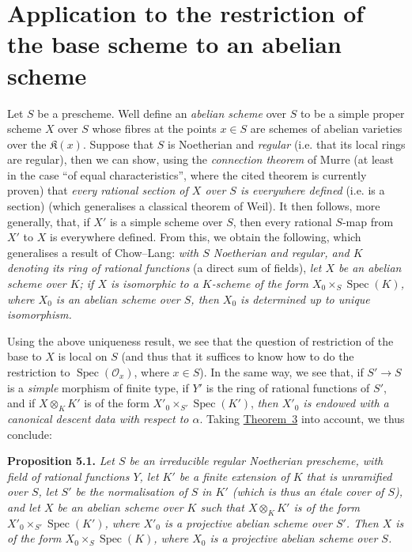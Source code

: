 \documentclass{article}
\newenvironment{itenv}[1]
  {\phantomsection\par\medskip\noindent\textbf{#1.}\itshape}
  {\medskip}
\newcommand{\scr}[1]{{\mathscr{#1}}}
\newcommand{\kres}{\mathfrak{K}}
\DeclareMathOperator{\Spec}{Spec}
\newcommand{\oldpage}[1]{\marginpar{\footnotesize$\Big\vert$ \textit{p.~#1}}}
\begin{document}
\section{Application to the restriction of the base scheme to an abelian scheme}
\label{B.5}

Let $S$ be a prescheme.
Well define an \emph{abelian scheme} over $S$ to be a simple proper scheme $X$
\oldpage{190-26}
over $S$ whose fibres at the points $x\in S$ are schemes of abelian varieties over the $\kres(x)$.
Suppose that $S$ is Noetherian and \emph{regular} (i.e. that its local rings are regular), then we can show, using the \emph{connection theorem} of Murre \cite{4} (at least in the case ``of equal characteristics'', where the cited theorem is currently proven) that \emph{every rational section of $X$ over $S$ is everywhere defined} (i.e. is a section) (which generalises a classical theorem of Weil).
It then follows, more generally, that, if $X'$ is a simple scheme over $S$, then every rational $S$-map from $X'$ to $X$ is everywhere defined.
From this, we obtain the following, which generalises a result of Chow--Lang:
\emph{with $S$ Noetherian and regular, and $K$ denoting its ring of rational functions} (a direct sum of fields), \emph{let $X$ be an abelian scheme over $K$; if $X$ is isomorphic to a $K$-scheme of the form $X_0\times_S\Spec(K)$, where $X_0$ is an abelian scheme over $S$, then $X_0$ is determined up to unique isomorphism.}

Using the above uniqueness result, we see that the question of restriction of the base to $X$ is local on $S$ (and thus that it suffices to know how to do the restriction to $\Spec(\scr{O}_x)$, where $x\in S$).
In the same way, we see that, if $S'\to S$ is a \emph{simple} morphism of finite type, if $Y'$ is the ring of rational functions of $S'$, and if $X\otimes_K K'$ is of the form $X'_0\times_{S'}\Spec(K')$, \emph{then $X'_0$ is endowed with a canonical descent data with respect to $\alpha$}.
Taking \hyperref[theorem:B.1(3)]{Theorem~3} into account, we thus conclude:

\begin{itenv}{Proposition 5.1}
  Let $S$ be an irreducible regular Noetherian prescheme, with field of rational functions $Y$, let $K'$ be a finite extension of $K$ that is \emph{unramified over $S$}, let $S'$ be the normalisation of $S$ in $K'$ (which is thus an \'{e}tale cover of $S$), and let $X$ be an abelian scheme over $K$ such that $X\otimes_K K'$ is of the form $X'_0\times_{S'}\Spec(K')$, where $X'_0$ is a projective abelian scheme over $S'$.
  Then $X$ is of the form $X_0\times_S\Spec(K)$, where $X_0$ is a projective abelian scheme over $S$.
\end{itenv}
\end{document}
